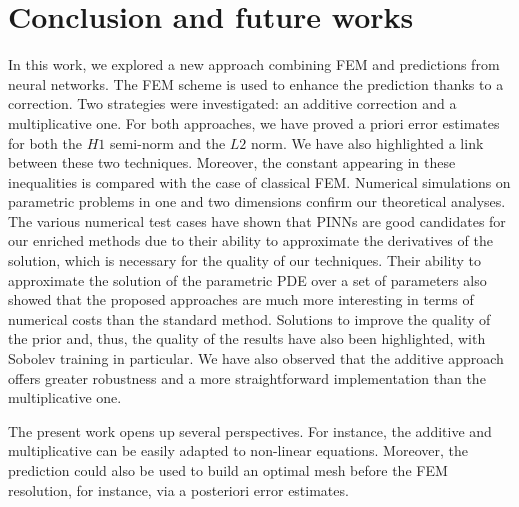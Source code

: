 \section{Conclusion and future works}

In this work, we explored a new approach combining FEM and predictions from neural networks. The FEM scheme is used to enhance the prediction thanks to a correction. Two strategies were investigated: an additive correction and a multiplicative one.
For both approaches, we have proved a priori error estimates for both the $ H1$ semi-norm and the $ L2$ norm. 
We have also highlighted a link between these two techniques. 
Moreover, the constant appearing in these inequalities is compared with the case of classical FEM.
Numerical simulations on parametric problems in one and two dimensions confirm our theoretical analyses. The various numerical test cases have shown that PINNs are good candidates for our enriched methods due to their ability to approximate the derivatives of the solution, which is necessary for the quality of our techniques. Their ability to approximate the solution of the parametric PDE over a set of parameters also showed that the proposed approaches are much more interesting in terms of numerical costs than the standard method. Solutions to improve the quality of the prior and, thus, the quality of the results have also been highlighted, with Sobolev training in particular. We have also observed that the additive approach offers greater robustness and a more straightforward implementation than the multiplicative one. 


The present work opens up several perspectives. For instance, the additive and multiplicative can be easily adapted to non-linear equations. Moreover, the prediction could also be used to build an optimal mesh before the FEM resolution, for instance, via a posteriori error estimates.